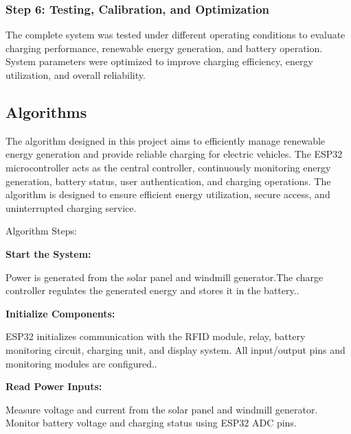 \documentclass[12pt]{report}
\begin{document}
\begin{Certificatepage}
\begin{center}
\begin{justify}
\subsubsection{\textbf{Step 6: Testing, Calibration, and Optimization}}

The complete system was tested under different operating conditions to evaluate charging performance, renewable energy generation, and battery operation. System parameters were optimized to improve charging efficiency, energy utilization, and overall reliability.

 

 
\vspace{10pt}
\par

\newpage

\subsection{Algorithms}
\label{algo}
The algorithm designed in this project aims to efficiently manage renewable energy generation and provide reliable charging for electric vehicles. The ESP32 microcontroller acts as the central controller, continuously monitoring energy generation, battery status, user authentication, and charging operations. The algorithm is designed to ensure efficient energy utilization, secure access, and uninterrupted charging service.

\vspace{10pt}
\par
Algorithm Steps:
\vspace{10pt}
\par
\textbf{Start the System:}

\par
Power is generated from the solar panel and windmill generator.The charge controller regulates the generated energy and stores it in the battery..
\vspace{10pt}
\par

\textbf{Initialize Components:}
\par
ESP32 initializes communication with the RFID module, relay, battery monitoring circuit, charging unit, and display system. All input/output pins and monitoring modules are configured..
\vspace{10pt}
\par

\textbf{Read Power Inputs:}
\par
Measure voltage and current from the solar panel and windmill generator.
Monitor battery voltage and charging status using ESP32 ADC pins.
\vspace{10pt}
\par


\end{justify}
\end{center}
\end{Certificatepage}
\end{document}

